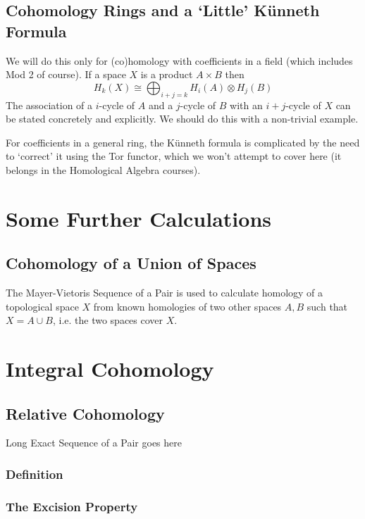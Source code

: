 \documentclass[oneside,english]{amsbook}
\numberwithin{section}{chapter}
\theoremstyle{plain}
\theoremstyle{definition}
\providecommand{\Kunneth}{K{\"u}nneth }
\begin{document}
	\section{Cohomology Rings and a `Little' \Kunneth Formula}
	
	We will do this only for (co)homology with coefficients in a field (which includes Mod 2 of course). If a space $X$ is a product $A\times B$ then
	\[
		H_k (X) \cong \bigoplus_{i+j=k} H_i(A)\otimes H_j (B) 
 	\]
 	The association of a $i$-cycle of $A$ and a $j$-cycle of $B$ with an $i+j$-cycle of $X$ can be stated concretely and explicitly. We should do this with a non-trivial example.
 	
 	For coefficients in a general ring, the \Kunneth formula is complicated by the need to `correct' it using the Tor functor, which we won't attempt to cover here (it belongs in the Homological Algebra courses).
	
	\chapter{Some Further Calculations}
	
	\section{Cohomology of a Union of Spaces}
	The Mayer-Vietoris Sequence of a Pair is used to calculate homology of a topological space $X$ from known homologies of two other spaces $A, B$ such that $X = A\cup B$, i.e. the two spaces cover $X$.


	\chapter{Integral Cohomology}
	\section{Relative Cohomology}
	
	Long Exact Sequence of a Pair goes here
	
	\subsection{Definition}
	
	\subsection{The Excision Property}
	
\end{document}
